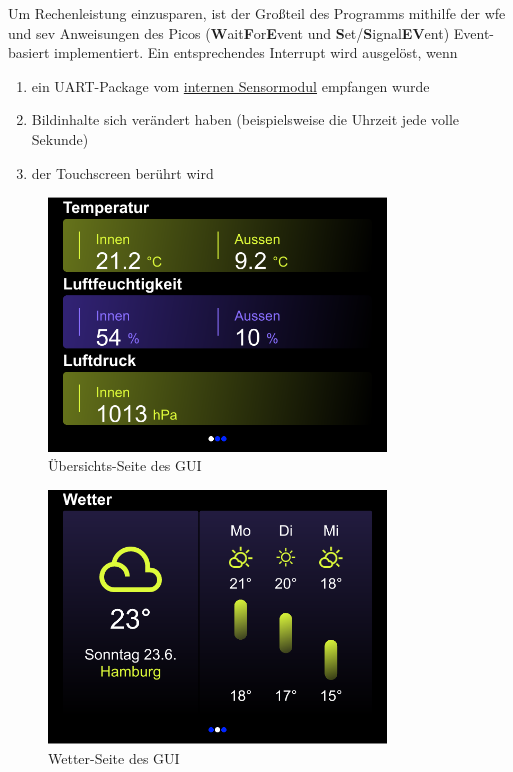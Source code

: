 \documentclass[a4paper,11pt]{article}
\begin{document}
\vspace{0.3cm}
\noindent
Um Rechenleistung einzusparen, ist der Großteil des Programms mithilfe der wfe und sev Anweisungen des Picos (\textbf{W}ait\textbf{F}or\textbf{E}vent und \textbf{S}et/\textbf{S}ignal\textbf{EV}ent) Event-basiert implementiert.
Ein entsprechendes Interrupt wird ausgelöst, wenn
\begin{enumerate}
	\item ein UART-Package vom \hyperref[subsubsub:sensormodulInt]{internen Sensormodul} empfangen wurde
	\item Bildinhalte sich verändert haben (beispielsweise die Uhrzeit jede volle Sekunde)
	\item der Touchscreen berührt wird
\end{enumerate}



\begin{figure}[H]
	\centering
	\includegraphics[width=0.8\textwidth]{Overview}
	\caption{Übersichts-Seite des GUI}
	\label{fig:gui-overview}
\end{figure}

\begin{figure}[H]
	\centering
	\includegraphics[width=0.8\textwidth]{Weather}
	\caption{Wetter-Seite des GUI}
	\label{fig:gui-overview}
\end{figure}
\end{document}
